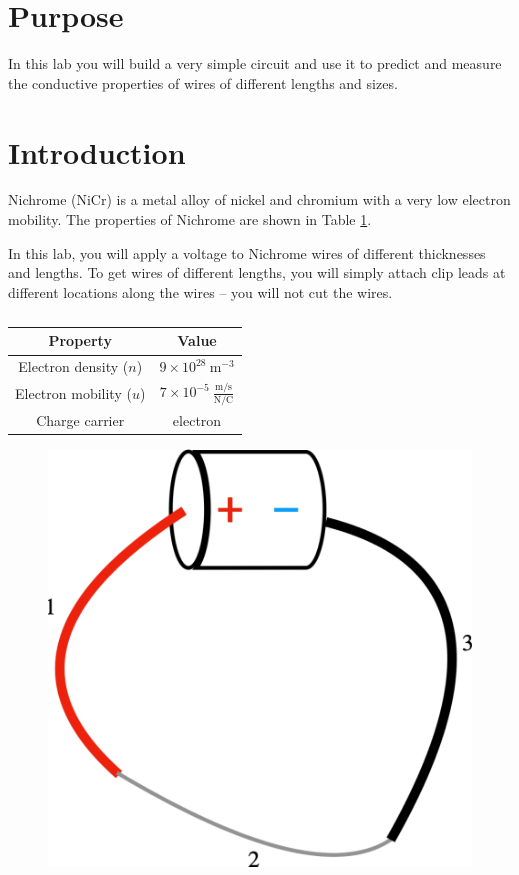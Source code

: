 \documentclass[12pt]{article}
\begin{document}
	\section*{Purpose}
	In this lab you will build a very simple circuit and use it to predict and measure the conductive properties of wires of different lengths and sizes.
	\section*{Introduction}
	Nichrome (NiCr) is a metal alloy of nickel and chromium with a very low electron mobility. The properties of Nichrome are shown in Table \ref{tab1}.
	
	In this lab, you will apply a voltage to Nichrome wires of different thicknesses and lengths. To get wires of different lengths, you will simply attach clip leads at different locations along the wires -- you will not cut the wires.
	\begin{table}[ht]
		\centering
		\begin{tabular}{|c|c|}
			\hline
			\textbf{Property} & \textbf{Value} \\
			\hline
			Electron density ($n$) & $9\times10^{28}\ \mathrm{m}^{-3}$\\
			\hline 
			Electron mobility ($u$) & $7\times10^{-5}\ \frac{\mathrm{m}/\mathrm{s}}{\mathrm{N}/\mathrm{C}}$\\
			\hline 
			Charge carrier & electron \\
			\hline
		\end{tabular}
		\caption{}
		\label{tab1}
	\end{table}

\begin{figure}
		\centering
		\includegraphics[width=.75\textwidth]{labfig}
		\caption{}
		\label{fig1}
\end{figure}
\end{document}
